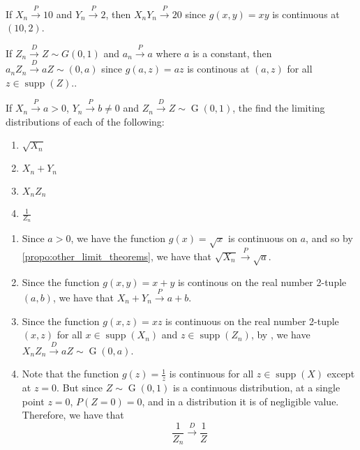 \documentclass[notoc,notitlepage]{tufte-book}
\DeclareMathOperator{\Gau}{G }
\DeclareMathOperator{\supp}{supp }
\newcommand{\convd}{\overset{D}{\to}}
\newcommand{\convp}{\overset{P}{\to}}
\begin{document}
\begin{eg}
  If $X_n \convp 10$ and $Y_n \convp 2$, then $X_n Y_n \convp 20$ since $g(x, y) = xy$ is continuous at $(10, 2)$.

  \noindent If $Z_n \convd Z \sim G(0, 1)$ and $a_n \convp a$ where $a$ is a constant, then $a_n Z_n \convd aZ \sim (0, a)$ since $g(a, z) = az$ is continous at $(a, z)$ for all $z \in \supp(Z)$..
\end{eg}

\begin{eg}
  If $X_n \convp a > 0$, $Y_n \convp b \neq 0$ and $Z_n \convd Z \sim \Gau(0, 1)$, the find the limiting distributions of each of the following:
  \begin{enumerate}
    \item $\sqrt{X_n}$
    \item $X_n + Y_n$
    \item $X_n Z_n$
    \item $\frac{1}{Z_n}$
  \end{enumerate}
\end{eg}

\begin{solution}
  \begin{enumerate}
    \item Since $a > 0$, we have the function $g(x) = \sqrt{x}$ is continuous on $a$, and so by \cref{propo:other_limit_theorems}, we have that $\sqrt{X_n} \convp \sqrt{a}$.
    \item Since the function $g(x, y) = x + y$ is continous on the real number 2-tuple $(a, b)$, we have that $X_n + Y_n \convp a + b$.
    \item Since the function $g(x, z) = xz$ is continuous on the real number 2-tuple $(x, z)$ for all $x \in \supp(X_n)$ and $z \in \supp(Z_n)$, by , we have $X_n Z_n \convd a Z \sim \Gau(0, a)$.
    \item Note that the function $g(z) = \frac{1}{z}$ is continuous for all $z \in \supp(X)$ except at $z = 0$. But since $Z \sim \Gau(0, 1)$ is a continuous distribution, at a single point $z = 0$, $P(Z = 0) = 0$, and in a distribution it is of negligible value. Therefore, we have that
      \begin{equation*}
        \frac{1}{Z_n} \convd \frac{1}{Z}
      \end{equation*}
  \end{enumerate}
\end{solution}
\end{document}
